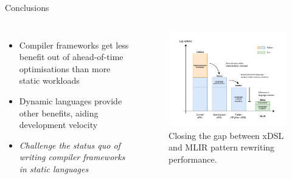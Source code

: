 \documentclass[10pt,aspectratio=169]{beamer}
\begin{document}
\begin{frame}{Conclusions}
    \begin{columns}[T,onlytextwidth]
            \vspace{3em}
            \begin{itemize}
                \itemindent=-13pt
                \item Compiler frameworks get less benefit out of ahead-of-time optimisations than more static workloads
                \item Dynamic languages provide other benefits, aiding development velocity
                \vspace{1.5em}
                \item \textit{Challenge the status quo of writing compiler frameworks in static languages}
            \end{itemize}
            \begin{figure}[H]
                \vspace{-1em}
                \includegraphics[width=\textwidth]{images/narrative.drawio.pdf}
                \vspace{-1.5em}
                \caption{Closing the gap between xDSL and MLIR pattern rewriting performance.}
                \label{fig:narrative}
            \end{figure}
    \end{columns}
\end{frame}
\end{document}
